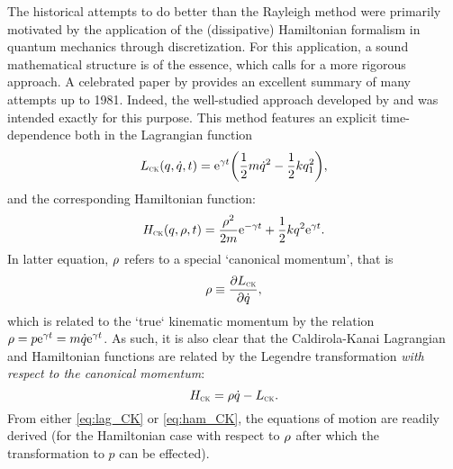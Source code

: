 The historical attempts to do better than the Rayleigh method were primarily motivated by the application of the (dissipative) Hamiltonian formalism in quantum mechanics through discretization. For this application, a sound mathematical structure is of the essence, which calls for a more rigorous approach. A celebrated paper by
\citet{Dekker1981} provides an excellent summary of many attempts up to 1981. Indeed, the well-studied approach developed by \citet{Caldirola1941} and \citet{Kanai1948} was intended exactly for this purpose. This method features an explicit time-dependence both in the Lagrangian function
\begin{equation}
    L_\text{\tiny{\textsc{CK}}}(q, \dot{q}, t) = \mathrm{e}^{\gamma t}\qty(\frac{1}{2}m\dot{q}^2 - \frac{1}{2}kq_1^2),
    \label{eq:lag_CK}
\end{equation}
and the corresponding Hamiltonian function:
\begin{equation}
    H_\text{\tiny{\textsc{CK}}}(q, \rho, t) = \frac{\rho^2}{2m}\mathrm{e}^{-\gamma t} + \frac{1}{2}kq^2\mathrm{e}^{\gamma t}.
    \label{eq:ham_CK}
\end{equation}
In latter equation, $\rho$ refers to a special `canonical momentum', that is
\begin{equation}
    \rho \equiv \pdv{\ensuremath{L_\text{\tiny{\textsc{CK}}}}}{\dot{q}},
    \label{eq:can_momentum}
\end{equation}
which is related to the `true` kinematic momentum by the relation $\rho = p\mathrm{e}^{\gamma
t} = m\dot{q}\mathrm{e}^{\gamma t}$. As such, it is also clear that the Caldirola-Kanai Lagrangian and Hamiltonian functions are related by the Legendre transformation \emph{with respect to the canonical momentum}:
$$ H_\text{\tiny{\textsc{CK}}} = \rho \dot{q} - L_\text{\tiny{\textsc{CK}}}. $$
From either \cref{eq:lag_CK} or \cref{eq:ham_CK}, the equations of motion are readily
derived (for the Hamiltonian case with respect to $\rho$ after which the transformation to $p$ can be effected).
